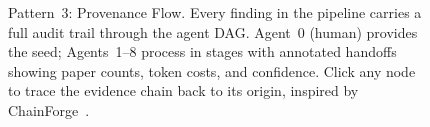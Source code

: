 \begin{figure}[t]
\caption{Pattern~3: Provenance Flow.  Every finding in the pipeline
carries a full audit trail through the agent DAG.  Agent~0 (human)
provides the seed; Agents~1--8 process in stages with annotated
handoffs showing paper counts, token costs, and confidence.  Click
any node to trace the evidence chain back to its origin, inspired
by ChainForge~\protect\cite{arawjo2024chainforge}.}
\label{fig:provenance}
\end{figure}




